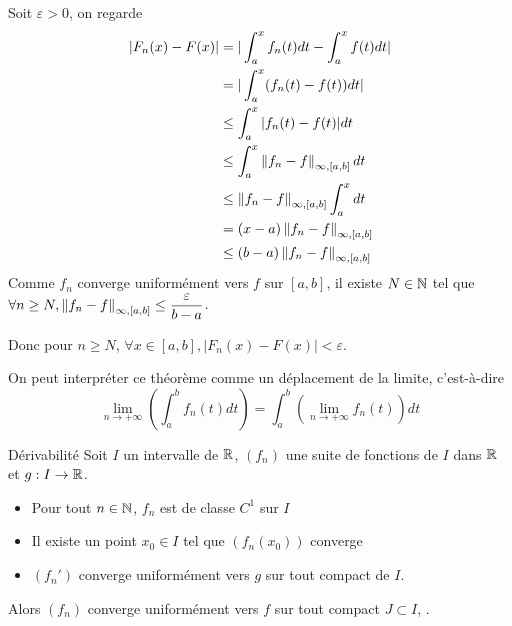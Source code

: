 \documentclass[a4paper,12pt]{article}
\begin{document}
\begin{demonstration}
    Soit $\varepsilon > 0$, on regarde
    \begin{align*}
        |F_n(x) - F(x)| &= |\int_a^x f_n(t) dt - \int_a^x f(t) dt| \\
        &= |\int_a^x (f_n(t) - f(t)) dt| \\
        &\leq \int_a^x |f_n(t) - f(t)| dt \\
        &\leq \int_a^x \left\lVert f_n - f\right\rVert_{\infty, [a, b]} dt \\
        &\leq \left\lVert f_n - f\right\rVert_{\infty, [a, b]} \int_a^x dt \\
        &= (x - a) \left\lVert f_n - f\right\rVert_{\infty, [a, b]} \\
        &\leq (b - a) \left\lVert f_n - f\right\rVert_{\infty, [a, b]}
    \end{align*}
    Comme $f_n$ converge uniformément vers $f$ sur $[a, b]$, il existe $N \in \mathbb{N}$ tel que $\forall n \geq N, \left\lVert f_n - f\right\rVert_{\infty, [a, b]} \leq \dfrac{\varepsilon}{b - a}$.

    Donc pour $n \geq N$, $\forall x \in [a, b], |F_n(x) - F(x)| < \varepsilon$.
\end{demonstration}

\begin{remarque}
    On peut interpréter ce théorème comme un déplacement de la limite, c'est-à-dire
    $$
    \lim\limits_{n \to +\infty} \left( \int_a^b f_n(t) dt \right) = \int_a^b \left( \lim\limits_{n \to +\infty} f_n(t) \right) dt
    $$
\end{remarque}

\clearpage

\begin{theoreme}{Dérivabilité}{}
    Soit $I$ un intervalle de $\mathbb{R}$, $(f_n)$ une suite de fonctions de $I$ dans $\mathbb{R}$ et $g: I \to \mathbb{R}$.

    \begin{itemize}[label=--]
        \item Pour tout $n \in \mathbb{N}$, $f_n$ est de classe $C^1$ sur $I$
        \item Il existe un point $x_0 \in I$ tel que $(f_n(x_0))$ converge
        \item $(f_n')$ converge uniformément vers $g$ sur tout compact de $I$.
    \end{itemize}
    Alors $(f_n)$ converge uniformément vers $f$ sur tout compact $J \subset I$, .
\end{theoreme}
\end{document}
